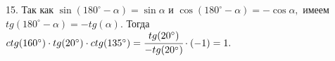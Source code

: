 15. Так как $\sin (180^\circ-\alpha)=\sin \alpha$ и $\cos (180^\circ-\alpha)=- \cos \alpha,$ имеем $tg(180^\circ-\alpha)=-tg(\alpha).$ Тогда $ctg(160^\circ)\cdot tg(20^\circ)\cdot ctg(135^\circ)=\cfrac{tg(20^\circ)}{-tg(20^\circ)}\cdot(-1)=1.$\\
